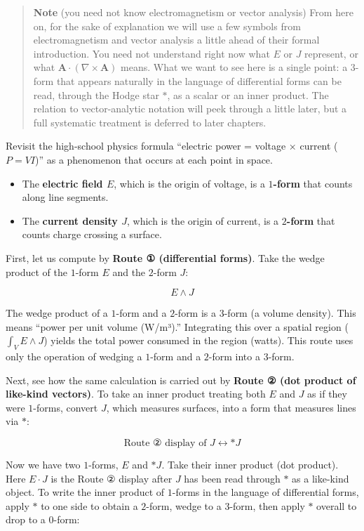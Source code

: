 \documentclass[a4paper,12pt,openany]{book}
\begin{document}
\begin{quote}
\textbf{Note} (you need not know electromagnetism or vector analysis)
From here on, for the sake of explanation we will use a few symbols from
electromagnetism and vector analysis a little ahead of their formal
introduction. You need not understand right now what \(E\) or \(J\)
represent, or what \(\mathbf{A}\cdot(\nabla\times\mathbf{A})\) means.
What we want to see here is a single point: a \(3\)-form that appears
naturally in the language of differential forms can be read, through the
Hodge star \(\ast\), as a scalar or an inner product. The relation to
vector-analytic notation will peek through a little later, but a full
systematic treatment is deferred to later chapters.
\end{quote}

Revisit the high-school physics formula ``electric power = voltage ×
current (\(P=VI\))'' as a phenomenon that occurs at each point in space.

\begin{itemize}
\item
  The \textbf{electric field $E$}, which is the origin of voltage, is a
  \textbf{$1$-form} that counts along line segments.
\item
  The \textbf{current density $J$}, which is the origin of current, is a
  \textbf{$2$-form} that counts charge crossing a surface.
\end{itemize}

First, let us compute by \textbf{Route ① (differential forms)}. Take the
wedge product of the \(1\)-form \(E\) and the \(2\)-form \(J\):

\[E \wedge J\]

The wedge product of a \(1\)-form and a \(2\)-form is a \(3\)-form (a
volume density). This means ``power per unit volume (W/m³).''
Integrating this over a spatial region (\(\int_V E \wedge J\)) yields
the total power consumed in the region (watts). This route uses only the
operation of wedging a \(1\)-form and a \(2\)-form into a \(3\)-form.

Next, see how the same calculation is carried out by
\textbf{Route ② (dot product of like-kind vectors)}. To take an inner
product treating both \(E\) and \(J\) as if they were \(1\)-forms,
convert \(J\), which measures surfaces, into a form that measures lines
via \(\ast\):

\[\text{Route ② display of }J \longleftrightarrow \ast J\]

Now we have two \(1\)-forms, \(E\) and \(\ast J\). Take their inner
product (dot product). Here \(E\cdot J\) is the Route ② display after
\(J\) has been read through \(\ast\) as a like-kind object. To write the
inner product of \(1\)-forms in the language of differential forms,
apply \(\ast\) to one side to obtain a \(2\)-form, wedge to a
\(3\)-form, then apply \(\ast\) overall to drop to a \(0\)-form:
\end{document}
